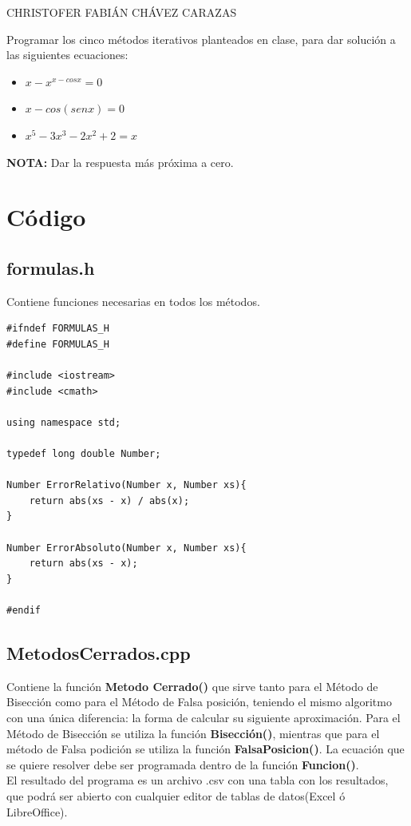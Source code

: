 \documentclass[a4paper,12pt]{article}
\begin{document}
\begin{LARGE}
 CHRISTOFER FABIÁN CHÁVEZ CARAZAS
\end{LARGE}

Programar los cinco métodos iterativos planteados en clase, para dar solución a las siguientes ecuaciones:

\begin{itemize}
 \item $x-x^{x-cosx} = 0$
 \item $x-cos(senx) = 0$
 \item $x^5 - 3x^3 - 2x^2 + 2 = x$
\end{itemize}

\textbf{NOTA: }Dar la respuesta más próxima a cero.

\section{Código}

  \subsection{formulas.h}
   
  Contiene funciones necesarias en todos los métodos.
  
  \begin{lstlisting}
#ifndef FORMULAS_H
#define FORMULAS_H

#include <iostream>
#include <cmath>

using namespace std;

typedef long double Number;

Number ErrorRelativo(Number x, Number xs){
	return abs(xs - x) / abs(x);
}

Number ErrorAbsoluto(Number x, Number xs){
	return abs(xs - x);
}

#endif
  \end{lstlisting}
  
  \subsection{MetodosCerrados.cpp}
  
  Contiene la función \textbf{Metodo Cerrado()} que sirve tanto para el Método de Bisección como para el Método
  de Falsa posición, teniendo el mismo algoritmo con una única diferencia: la forma de calcular su siguiente aproximación.
  Para el Método de Bisección se utiliza la función \textbf{Bisección()}, mientras que para el método de Falsa podición se 
  utiliza la función \textbf{FalsaPosicion()}. La ecuación que se quiere resolver debe ser programada dentro de la función
  \textbf{Funcion()}. \\
  El resultado del programa es un archivo .csv con una tabla con los resultados, que podrá 
  ser abierto con cualquier editor de tablas de datos(Excel ó LibreOffice).
  
\end{document}
